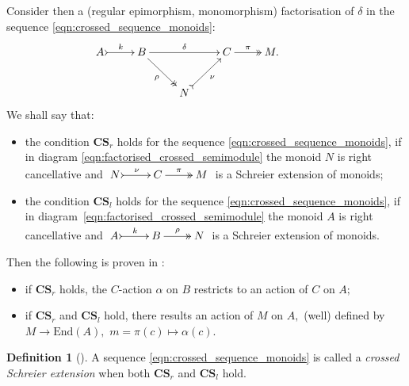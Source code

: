 \documentclass[a4paper]{amsart}
\theoremstyle{plain}
\theoremstyle{definition}
\newtheorem{definition}[subsection]{Definition}
\theoremstyle{remark}
\begin{document}
Consider then a (regular epimorphism, monomorphism) factorisation of $\delta$ in the sequence \eqref{eqn:crossed_sequence_monoids}:
\begin{equation}
\label{eqn:factorised_crossed_semimodule}
\begin{aligned}
\xymatrix{
A \ar@{>->}[r]^-k &B \ar@{->>}[rd]_-{\rho} \ar[rr]^-{\delta} & \ &C \ar@{->>}[r]^-{\pi} &{M.} \\
 &\ &N \ar@{>->}[ru]_-{\nu}&\ &\ &\
}
\end{aligned}
\end{equation}
We shall say that:
\begin{itemize}
\item the condition $\mathbf{CS}_r$ holds for the sequence \eqref{eqn:crossed_sequence_monoids}, if in diagram \eqref{eqn:factorised_crossed_semimodule} the monoid $N$ is right cancellative and $\xymatrix{N \ar@{>->}[r]^-{\nu} &C \ar@{->>}[r]^-{\pi} &M}$ is a Schreier extension of monoids;
\item the condition $\mathbf{CS}_l$ holds for the sequence \eqref{eqn:crossed_sequence_monoids}, if in diagram~\eqref{eqn:factorised_crossed_semimodule} the monoid $A$ is right cancellative and $\xymatrix{A \ar@{>->}[r]^-{k} &B \ar@{->>}[r]^-{\rho} &N}$ is a Schreier extension of monoids.
\end{itemize}
Then the following is proven in \cite{AMMPS}:
\begin{itemize}
\item if $\mathbf{CS}_r$ holds, the $C$-action $\alpha$ on $B$ restricts to an action of $C$ on $A;$
\item if $\mathbf{CS}_r$ and $\mathbf{CS}_l$ hold, there results an action of $M$ on $A,$ (well) defined by $M\longrightarrow\mathrm{End}(A),$ $m=\pi(c)\mapsto \alpha(c).$
\end{itemize}

\begin{definition}[\cite{AMMPS}]
\label{def:crossed_Schreier_extension}
A sequence \eqref{eqn:crossed_sequence_monoids} is called a \emph{crossed Schreier extension} when both $\mathbf{CS}_r$ and $\mathbf{CS}_l$ hold.
\end{definition}
\end{document}
